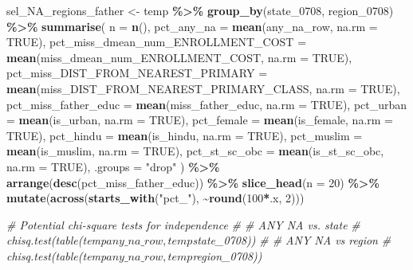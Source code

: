 \documentclass[
]{article}
\newenvironment{Shaded}{\begin{snugshade}}{\end{snugshade}}
\newcommand{\AttributeTok}[1]{\textcolor[rgb]{0.13,0.29,0.53}{#1}}
\newcommand{\CommentTok}[1]{\textcolor[rgb]{0.56,0.35,0.01}{\textit{#1}}}
\newcommand{\ConstantTok}[1]{\textcolor[rgb]{0.56,0.35,0.01}{#1}}
\newcommand{\DecValTok}[1]{\textcolor[rgb]{0.00,0.00,0.81}{#1}}
\newcommand{\FunctionTok}[1]{\textcolor[rgb]{0.13,0.29,0.53}{\textbf{#1}}}
\newcommand{\NormalTok}[1]{#1}
\newcommand{\OtherTok}[1]{\textcolor[rgb]{0.56,0.35,0.01}{#1}}
\newcommand{\SpecialCharTok}[1]{\textcolor[rgb]{0.81,0.36,0.00}{\textbf{#1}}}
\newcommand{\StringTok}[1]{\textcolor[rgb]{0.31,0.60,0.02}{#1}}
\begin{document}
\begin{Shaded}
\begin{Highlighting}[]
\NormalTok{sel\_NA\_regions\_father }\OtherTok{\textless{}{-}}\NormalTok{ temp }\SpecialCharTok{\%\textgreater{}\%} 
  \FunctionTok{group\_by}\NormalTok{(state\_0708, region\_0708) }\SpecialCharTok{\%\textgreater{}\%}
  \FunctionTok{summarise}\NormalTok{(}
    \AttributeTok{n =} \FunctionTok{n}\NormalTok{(),}
    \AttributeTok{pct\_any\_na =} \FunctionTok{mean}\NormalTok{(any\_na\_row, }\AttributeTok{na.rm =} \ConstantTok{TRUE}\NormalTok{),}
    \AttributeTok{pct\_miss\_dmean\_num\_ENROLLMENT\_COST =} \FunctionTok{mean}\NormalTok{(miss\_dmean\_num\_ENROLLMENT\_COST, }\AttributeTok{na.rm =} \ConstantTok{TRUE}\NormalTok{),}
    \AttributeTok{pct\_miss\_DIST\_FROM\_NEAREST\_PRIMARY =} \FunctionTok{mean}\NormalTok{(miss\_DIST\_FROM\_NEAREST\_PRIMARY\_CLASS, }\AttributeTok{na.rm =} \ConstantTok{TRUE}\NormalTok{),}
    \AttributeTok{pct\_miss\_father\_educ =} \FunctionTok{mean}\NormalTok{(miss\_father\_educ, }\AttributeTok{na.rm =} \ConstantTok{TRUE}\NormalTok{),}
    \AttributeTok{pct\_urban =} \FunctionTok{mean}\NormalTok{(is\_urban, }\AttributeTok{na.rm =} \ConstantTok{TRUE}\NormalTok{),}
    \AttributeTok{pct\_female =} \FunctionTok{mean}\NormalTok{(is\_female, }\AttributeTok{na.rm =} \ConstantTok{TRUE}\NormalTok{),}
    \AttributeTok{pct\_hindu =} \FunctionTok{mean}\NormalTok{(is\_hindu, }\AttributeTok{na.rm =} \ConstantTok{TRUE}\NormalTok{),}
    \AttributeTok{pct\_muslim =} \FunctionTok{mean}\NormalTok{(is\_muslim, }\AttributeTok{na.rm =} \ConstantTok{TRUE}\NormalTok{),}
    \AttributeTok{pct\_st\_sc\_obc =} \FunctionTok{mean}\NormalTok{(is\_st\_sc\_obc, }\AttributeTok{na.rm =} \ConstantTok{TRUE}\NormalTok{),}
    \AttributeTok{.groups =} \StringTok{"drop"}
\NormalTok{  ) }\SpecialCharTok{\%\textgreater{}\%}
  \FunctionTok{arrange}\NormalTok{(}\FunctionTok{desc}\NormalTok{(pct\_miss\_father\_educ)) }\SpecialCharTok{\%\textgreater{}\%}
  \FunctionTok{slice\_head}\NormalTok{(}\AttributeTok{n =} \DecValTok{20}\NormalTok{) }\SpecialCharTok{\%\textgreater{}\%}
  \FunctionTok{mutate}\NormalTok{(}\FunctionTok{across}\NormalTok{(}\FunctionTok{starts\_with}\NormalTok{(}\StringTok{"pct\_"}\NormalTok{), }\SpecialCharTok{\textasciitilde{}}\FunctionTok{round}\NormalTok{(}\DecValTok{100}\SpecialCharTok{*}\NormalTok{.x, }\DecValTok{2}\NormalTok{)))}

\CommentTok{\# Potential chi{-}square tests for independence}
\CommentTok{\# \# ANY NA vs. state}
\CommentTok{\# chisq.test(table(temp$any\_na\_row, temp$state\_0708))}
\CommentTok{\# \# ANY NA vs region}
\CommentTok{\# chisq.test(table(temp$any\_na\_row, temp$region\_0708))}






\end{Highlighting}
\end{Shaded}
\end{document}

